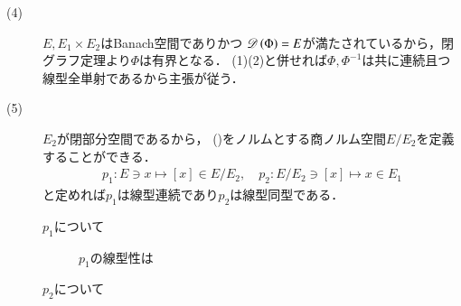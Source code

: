 \begin{prf}
\begin{description}
			\item[(4)] $E,E_1 \times E_2$はBanach空間でありかつ
				$\Dom{\Phi} = E$が満たされているから，閉グラフ定理より$\Phi$は有界となる．
				(1)(2)と併せれば$\Phi,\Phi^{-1}$は共に連続且つ線型全単射であるから主張が従う．
			
			\item[(5)] 
				$E_2$が閉部分空間であるから，
				()をノルムとする商ノルム空間$E/E_2$を定義することができる．
				\begin{align}
					p_1:E \ni x \longmapsto [x] \in E/E_2,
					\quad p_2:E/E_2 \ni [x] \longmapsto x \in E_1
				\end{align}
				と定めれば$p_1$は線型連続であり$p_2$は線型同型である．
				\begin{description}
					\item[$p_1$について]
						$p_1$の線型性は
					\item[$p_2$について]
				\end{description}
				
		\end{description}
	\end{prf}